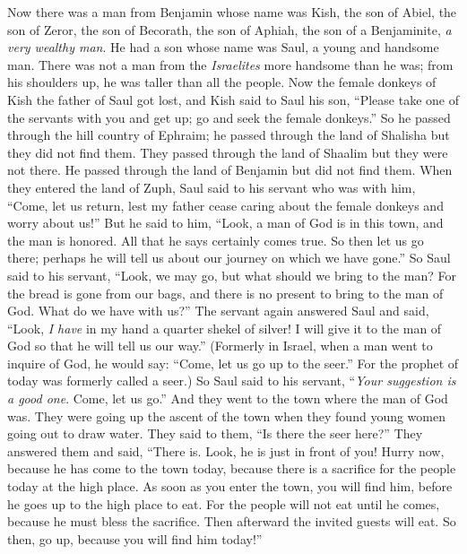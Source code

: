 \begin{biblechapter} %
 Now there was a man from Benjamin whose name was Kish, the son of Abiel, the son of Zeror, the son of Becorath, the son of Aphiah, the son of a Benjaminite, \textit{a very wealthy man}.
\verse He had a son whose name was Saul, a young and handsome man. There was not a man from the \textit{Israelites} more handsome than he was; from his shoulders up, he was taller than all the people.
\verse Now the female donkeys of Kish the father of Saul got lost, and Kish said to Saul his son, “Please take one of the servants with you and get up; go and seek the female donkeys.”
\verse So he passed through the hill country of Ephraim; he passed through the land of Shalisha but they did not find them. They passed through the land of Shaalim but they were not there. He passed through the land of Benjamin but did not find them.
\verse When they entered the land of Zuph, Saul said to his servant who was with him, “Come, let us return, lest my father cease caring about the female donkeys and worry about us!”
\verse But he said to him, “Look, a man of God is in this town, and the man is honored. All that he says certainly comes true. So then let us go there; perhaps he will tell us about our journey on which we have gone.”
\verse So Saul said to his servant, “Look, we may go, but what should we bring to the man? For the bread is gone from our bags, and there is no present to bring to the man of God. What do we have with us?”
\verse The servant again answered Saul and said, “Look, \textit{I have} in my hand a quarter shekel of silver! I will give it to the man of God so that he will tell us our way.”
\verse (Formerly in Israel, when a man went to inquire of God, he would say: “Come, let us go up to the seer.” For the prophet of today was formerly called a seer.)
\verse So Saul said to his servant, “\textit{Your suggestion is a good one}. Come, let us go.” And they went to the town where the man of God was.
\verse They were going up the ascent of the town when they found young women going out to draw water. They said to them, “Is there the seer here?”
\verse They answered them and said, “There is. Look, he is just in front of you! Hurry now, because he has come to the town today, because there is a sacrifice for the people today at the high place.
\verse As soon as you enter the town, you will find him, before he goes up to the high place to eat. For the people will not eat until he comes, because he must bless the sacrifice. Then afterward the invited guests will eat. So then, go up, because you will find him today!”

\end{biblechapter}
